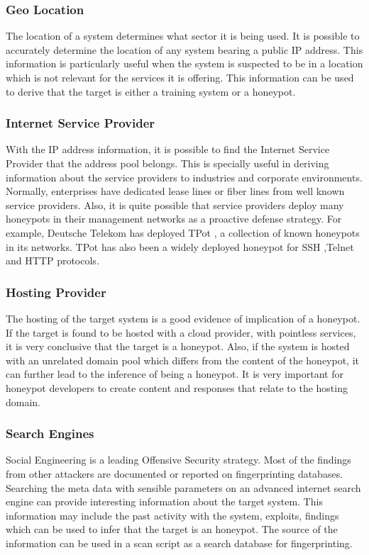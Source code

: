 \documentclass[letterpaper, 10 pt, conference]{ieeeconf}  %
\begin{document}
\subsubsection{Geo Location}
The location of a system determines what sector it is being used. It is possible to accurately determine the location of any system bearing a public IP address. This information is particularly useful when the system is suspected to be in a location which is not relevant for the services it is offering. This information can be used to derive that the target is either a training system or a honeypot. 

\subsubsection{Internet Service Provider}
With the IP address information, it is possible to find the Internet Service Provider that the address pool belongs. This is specially useful in deriving information about the service providers to industries and corporate environments. Normally, enterprises have dedicated lease lines or fiber lines from well known service providers. Also, it is quite possible that service providers deploy many honeypots in their management networks as a proactive defense strategy. For example, Deutsche Telekom has deployed TPot \cite{TPot}, a collection of known honeypots in its networks. TPot has also been a widely deployed honeypot for SSH ,Telnet and HTTP protocols. 

\subsubsection{Hosting Provider}
The hosting of the target system is a good evidence of implication of a honeypot. If the target is found to be hosted with a cloud provider, with pointless services, it is very conclusive that the target is a honeypot. Also, if the system is hosted with an unrelated domain pool which differs from the content of the honeypot, it can further lead to the inference of being a honeypot. It is very important for honeypot developers to create content and responses that relate to the hosting domain.  

\subsubsection{Search Engines}
Social Engineering is a leading Offensive Security strategy. Most of the findings from other attackers are documented or reported on fingerprinting databases. Searching the meta data with sensible parameters on an advanced internet search engine can provide interesting information about the target system. This information may include the past activity with the system, exploits, findings which can be used to infer that the target is an honeypot. The source of the information can be used in a scan script as a search database for fingerprinting. 
\end{document}
